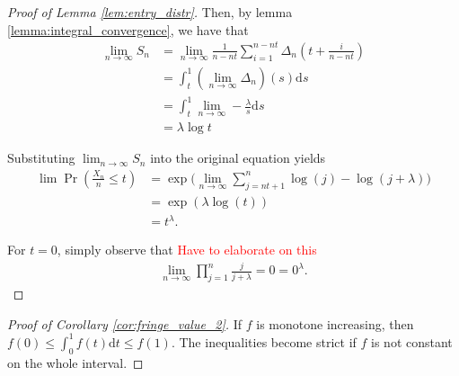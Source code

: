 \documentclass[a4paper]{article}
\newcommand{\dt}{\mathrm{d}t}
\newcommand{\ds}{\mathrm{d}s}
\begin{document}
\begin{proof}[Proof of Lemma \ref{lem:entry_distr}]
    Then, by lemma \ref{lemma:integral_convergence}, we have that
    \begin{align*}
        \lim_{n \to \infty} S_n &= \lim_{n \to \infty} \frac{1}{n-nt} \sum_{i=1}^{n-nt} \Delta_n \left( t + \frac{i}{n - nt} \right) \\
        &= \int_t^1 (\lim_{n \to \infty} \Delta_n)(s) \ds \\
        &= \int_t^1 \lim_{n \to \infty} -\frac{\lambda}{s} \ds \\
        &= \lambda \log{t}
    \end{align*}

    Substituting $\lim_{n \to \infty} S_n$ into the original equation yields
    \begin{align*}
        \lim \Pr \left( \frac{X_n}{n} \leq t \right) &= \exp \Bigg( \lim_{n \to \infty} \sum_{j = nt + 1}^n \log(j) - \log(j+\lambda) \Bigg) \\
        &= \exp(\lambda \log(t)) \\
        &= t^\lambda.
    \end{align*}

    For $t=0$, simply observe that \textcolor{red}{Have to elaborate on this}
    \begin{align*}
        \lim_{n \to \infty} \prod_{j = 1}^n \frac{j}{j + \lambda} = 0 = 0^\lambda.
    \end{align*}
\end{proof}

\begin{proof}[Proof of Corollary \ref{cor:fringe_value_2}]
    If $f$ is monotone increasing, then $f(0) \leq \int_0^1 f(t) \dt \leq f(1)$. The inequalities become strict if $f$ is not constant on the whole interval.
\end{proof}
\end{document}
